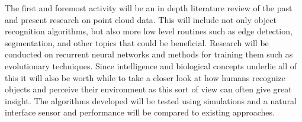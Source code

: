 The first and foremost activity will be an in depth literature review of the past and present research on point cloud data. This will include not only object recognition algorithms, but also more low level routines such as edge detection, segmentation, and other topics that could be beneficial. Research will be conducted on recurrent neural networks and methods for training them such as evolutionary techniques. Since intelligence and biological concepts underlie all of this it will also be worth while to take a closer look at how humans recognize objects and perceive their environment as this sort of view can often give great insight. The algorithms developed will be tested using simulations and a natural interface sensor and performance will be compared to existing approaches.